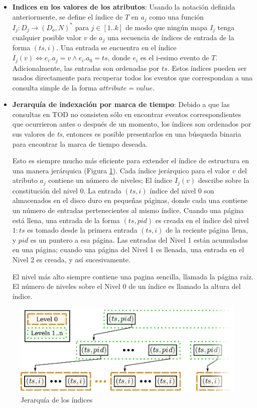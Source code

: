 \documentclass[12pt,legalpaper]{report}
\begin{document}
\begin{itemize}
	\item \textbf{Indices en los valores de los atributos}: Usando la notación definida anteriormente, se define el índice de $T$ en $a_j$ como una función $I_j: D_j \rightarrow (D_o,N)^*$ para $j \in [1..k]$ de modo que ningún mapa $I_j$ tenga cualquier posible valor $v$ de $a_j$ una secuencia de índices de entrada de la forma $(ts,i)$.  Una entrada se encuentra en el índice $I_j(v) \Leftrightarrow e_i.a_j = v \wedge e_i.a_0 = ts$, donde $e_i$ es el i-esimo evento de $T$.  Adicionalmente, las entradas son ordenadas por $ts$.  Estos índices pueden ser usados directamente para recuperar todos los eventos que correspondan a una consulta simple de la forma $attribute = value$.
	
	\item \textbf{Jerarquía de indexación por marca de tiempo}: Debido a que las consultas en TOD no consisten sólo en encontrar eventos correspondientes que ocurrieron antes o después de un momento, los índices son ordenados por sus valores de \textit{ts}, entonces es posible presentarlos en una búsqueda binaria para encontrar la marca de tiempo deseada.

Esto es siempre mucho más eficiente para extender el índice de estructura en una manera jerárquica (Figura \ref{hierarchicalIndexes}).  Cada índice jerárquico para el valor $v$ del atributo $a_j$ contiene un número de niveles;  El índice $I_j(v)$ describe sobre la constitución del nivel 0.  La entrada $(ts, i)$ índice del nivel 0 son almacenados en el disco duro en pequeñas páginas, donde cada una contiene un número de entradas pertenecientes al mismo índice.  Cuando una página está llena, una entrada de la forma $(ts,pid)$ es creada en el índice del nivel $1: ts$ es tomado desde la primera entrada $(ts,i)$ de la reciente página llena, y $pid$ es un puntero a esa página.  Las entradas del Nivel 1 están acumuladas en una página; cuando una página del Nivel 1 es llenada, una entrada en el Nivel 2 es creada, y así sucesivamente.  

El nivel más alto siempre contiene una pagina sencilla, llamada la página raíz.  El número de niveles sobre el Nivel 0 de un índice es llamado la altura del índice.  
\end{itemize}

\begin{figure}[h]
	\centering
	\includegraphics[scale=0.8]{images/TOD/hierarchicalIndexes.eps}
	\caption{Jerarquía de los índices}
	\label{hierarchicalIndexes}
\end{figure}
\end{document}
